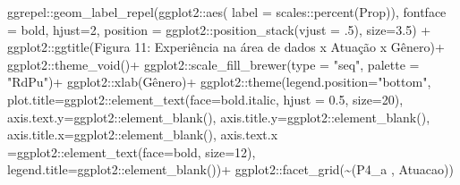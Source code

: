 \documentclass[
]{article}
\newenvironment{Shaded}{\begin{snugshade}}{\end{snugshade}}
\newcommand{\AttributeTok}[1]{\textcolor[rgb]{0.77,0.63,0.00}{#1}}
\newcommand{\DecValTok}[1]{\textcolor[rgb]{0.00,0.00,0.81}{#1}}
\newcommand{\FloatTok}[1]{\textcolor[rgb]{0.00,0.00,0.81}{#1}}
\newcommand{\FunctionTok}[1]{\textcolor[rgb]{0.00,0.00,0.00}{#1}}
\newcommand{\NormalTok}[1]{#1}
\newcommand{\SpecialCharTok}[1]{\textcolor[rgb]{0.00,0.00,0.00}{#1}}
\newcommand{\StringTok}[1]{\textcolor[rgb]{0.31,0.60,0.02}{#1}}
\begin{document}
\begin{Shaded}
\begin{Highlighting}[]
\NormalTok{  ggrepel}\SpecialCharTok{::}\FunctionTok{geom\_label\_repel}\NormalTok{(ggplot2}\SpecialCharTok{::}\FunctionTok{aes}\NormalTok{(}
    \AttributeTok{label =}\NormalTok{ scales}\SpecialCharTok{::}\FunctionTok{percent}\NormalTok{(Prop)),}
    \AttributeTok{fontface =} \StringTok{\textquotesingle{}bold\textquotesingle{}}\NormalTok{,}
    \AttributeTok{hjust=}\DecValTok{2}\NormalTok{,}
    \AttributeTok{position =}\NormalTok{ ggplot2}\SpecialCharTok{::}\FunctionTok{position\_stack}\NormalTok{(}\AttributeTok{vjust =}\NormalTok{ .}\DecValTok{5}\NormalTok{),}
    \AttributeTok{size=}\FloatTok{3.5}\NormalTok{) }\SpecialCharTok{+}
\NormalTok{  ggplot2}\SpecialCharTok{::}\FunctionTok{ggtitle}\NormalTok{(}\StringTok{\textquotesingle{}Figura 11: Experiência na área de dados x Atuação x Gênero\textquotesingle{}}\NormalTok{)}\SpecialCharTok{+}
\NormalTok{  ggplot2}\SpecialCharTok{::}\FunctionTok{theme\_void}\NormalTok{()}\SpecialCharTok{+}
\NormalTok{  ggplot2}\SpecialCharTok{::}\FunctionTok{scale\_fill\_brewer}\NormalTok{(}\AttributeTok{type =} \StringTok{"seq"}\NormalTok{, }\AttributeTok{palette =} \StringTok{"RdPu"}\NormalTok{)}\SpecialCharTok{+}
\NormalTok{  ggplot2}\SpecialCharTok{::}\FunctionTok{xlab}\NormalTok{(}\StringTok{\textquotesingle{}Gênero\textquotesingle{}}\NormalTok{)}\SpecialCharTok{+}
\NormalTok{  ggplot2}\SpecialCharTok{::}\FunctionTok{theme}\NormalTok{(}\AttributeTok{legend.position=}\StringTok{"bottom"}\NormalTok{,}
                 \AttributeTok{plot.title=}\NormalTok{ggplot2}\SpecialCharTok{::}\FunctionTok{element\_text}\NormalTok{(}\AttributeTok{face=}\StringTok{\textquotesingle{}bold.italic\textquotesingle{}}\NormalTok{,}
                                                  \AttributeTok{hjust =} \FloatTok{0.5}\NormalTok{, }\AttributeTok{size=}\DecValTok{20}\NormalTok{),}
                 \AttributeTok{axis.text.y=}\NormalTok{ggplot2}\SpecialCharTok{::}\FunctionTok{element\_blank}\NormalTok{(),}
                 \AttributeTok{axis.title.y=}\NormalTok{ggplot2}\SpecialCharTok{::}\FunctionTok{element\_blank}\NormalTok{(),}
                 \AttributeTok{axis.title.x=}\NormalTok{ggplot2}\SpecialCharTok{::}\FunctionTok{element\_blank}\NormalTok{(),}
                 \AttributeTok{axis.text.x =}\NormalTok{ggplot2}\SpecialCharTok{::}\FunctionTok{element\_text}\NormalTok{(}\AttributeTok{face=}\StringTok{\textquotesingle{}bold\textquotesingle{}}\NormalTok{, }\AttributeTok{size=}\DecValTok{12}\NormalTok{),}
                 \AttributeTok{legend.title=}\NormalTok{ggplot2}\SpecialCharTok{::}\FunctionTok{element\_blank}\NormalTok{())}\SpecialCharTok{+}
\NormalTok{  ggplot2}\SpecialCharTok{::}\FunctionTok{facet\_grid}\NormalTok{(}\SpecialCharTok{\textasciitilde{}}\StringTok{\textasciigrave{}}\AttributeTok{(\textquotesingle{}P4\_a \textquotesingle{}, \textquotesingle{}Atuacao\textquotesingle{})}\StringTok{\textasciigrave{}}\NormalTok{)}
\end{Highlighting}
\end{Shaded}
\end{document}
